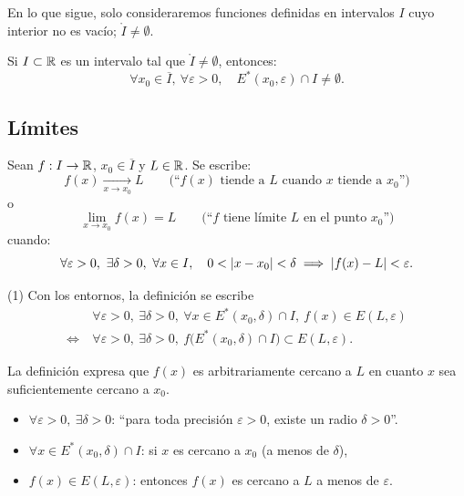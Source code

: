 \documentclass[11pt,a4paper]{article}
\newcommand{\Er}{E^{*}}                 %
\newcommand{\Int}[1]{\mathring{#1}}     %
\newcommand{\Cl}[1]{\overline{#1}}      %
\begin{document}
\begin{convencion}
En lo que sigue, solo consideraremos funciones definidas en intervalos $I$ cuyo interior no es vacío; $\Int{I}\neq\emptyset$.
\end{convencion}

\begin{proposicion}
Si $I\subset\mathbb{R}$ es un intervalo tal que $\Int{I}\neq\emptyset$, entonces:
\[
  \forall x_0\in\Cl{I},\ \forall\varepsilon>0,\quad \Er(x_0,\varepsilon)\cap I\neq\emptyset.
\]
\end{proposicion}

\subsection{Límites}

\begin{definicion}
Sean $f:I\to\mathbb{R}$, $x_0\in\Cl{I}$ y $L\in\mathbb{R}$. Se escribe:
\[
  f(x)\xrightarrow[x\to x_0]{} L \qquad\text{(``$f(x)$ tiende a $L$ cuando $x$ tiende a $x_0$'')}
\]
o
\[
  \lim_{x\to x_0} f(x) = L \qquad\text{(``$f$ tiene límite $L$ en el punto $x_0$'')}
\]
cuando:
\[
  \forall\varepsilon>0,\ \exists\delta>0,\ \forall x\in I,\quad 0<\abs{x-x_0}<\delta \implies \abs{f(x)-L}<\varepsilon.
\]
\end{definicion}

\begin{observacion}
(1) Con los entornos, la definición se escribe
\begin{align*}
  &\forall\varepsilon>0,\ \exists\delta>0,\ \forall x\in\Er(x_0,\delta)\cap I,\ f(x)\in E(L,\varepsilon)\\
  \iff\ &\forall\varepsilon>0,\ \exists\delta>0,\ f\big(\Er(x_0,\delta)\cap I\big)\subset E(L,\varepsilon).
\end{align*}
\end{observacion}

\begin{idea}
La definición expresa que $f(x)$ es arbitrariamente cercano a $L$ en cuanto $x$ sea suficientemente cercano a $x_0$.
\begin{itemize}
  \item $\forall\varepsilon>0,\ \exists\delta>0$: ``para toda precisión $\varepsilon>0$, existe un radio $\delta>0$''.
  \item $\forall x\in\Er(x_0,\delta)\cap I$: si $x$ es cercano a $x_0$ (a menos de $\delta$),
  \item $f(x)\in E(L,\varepsilon)$: entonces $f(x)$ es cercano a $L$ a menos de $\varepsilon$.
\end{itemize}
\end{idea}
\end{document}

